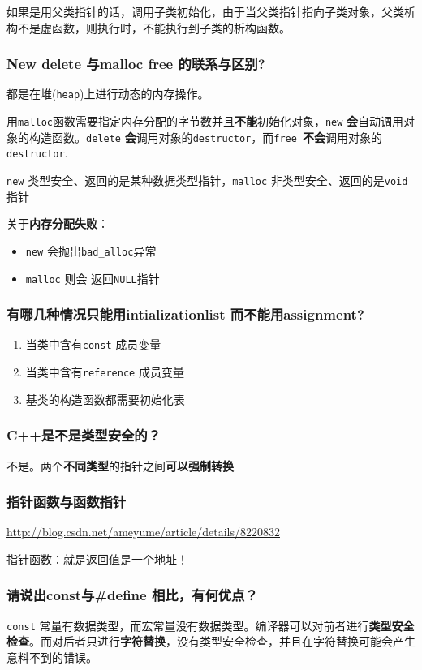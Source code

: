 \documentclass[UTF8,a4paper,8pt]{ctexart}
\begin{document}
			如果是用父类指针的话，调用子类初始化，由于当父类指针指向子类对象，父类析构不是虚函数，则执行时，不能执行到子类的析构函数。
			
		\subsubsection{New delete 与malloc free 的联系与区别?}
			都是在堆(\verb|heap|)上进行动态的内存操作。
			
			用\verb|malloc|函数需要指定内存分配的字节数并且\textbf{不能}初始化对象，\verb|new| \textbf{会}自动调用对象的构造函数。\verb|delete| \textbf{会}调用对象的\verb|destructor|，而\verb|free |\textbf{不会}调用对象的\verb|destructor|.
			
			\verb|new| 类型安全、返回的是某种数据类型指针，\verb|malloc| 非类型安全、返回的是\verb|void|指针
			
			关于\textbf{内存分配失败}：
				\begin{itemize}[itemindent = 2em]
					\item \verb|new| 会抛出\verb|bad_alloc|异常
					\item \verb|malloc| 则会 返回\verb|NULL|指针
				\end{itemize}
				
		\subsubsection{有哪几种情况只能用intializationlist 而不能用assignment?}
			\begin{enumerate}
				\item 当类中含有\verb|const| 成员变量
				\item 当类中含有\verb|reference| 成员变量
				\item 基类的构造函数都需要初始化表
			\end{enumerate}
		\subsubsection{C++是不是类型安全的？}
			不是。两个\textbf{不同类型}的指针之间\textbf{可以强制转换}
		
		\subsubsection{指针函数与函数指针}	
			\url{http://blog.csdn.net/ameyume/article/details/8220832}
			
			指针函数：就是返回值是一个地址！
			
		\subsubsection{请说出const与\#define 相比，有何优点？}
			\verb|const| 常量有数据类型，而宏常量没有数据类型。编译器可以对前者进行\textbf{类型安全检查}。而对后者只进行\textbf{字符替换}，没有类型安全检查，并且在字符替换可能会产生意料不到的错误。
			
\end{document}
